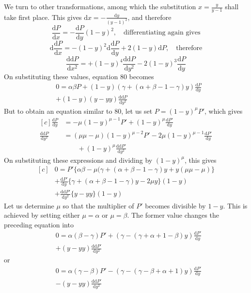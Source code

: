 We turn to other transformations, among which the substitution $x=\frac{y}{y-1}$ shall take first place. This gives $\mathrm{d}x=-\frac{\mathrm{d}y}{(y-1)^2}$, and therefore
\[
\frac{\mathrm{d}P}{\mathrm{d}x}=-\frac{\mathrm{d}P}{\mathrm{d}y}(1-y)^2,
\quad\text{differentiating again gives}
\]
\[
\mathrm{d}\frac{\mathrm{d}P}{\mathrm{d}x}=-(1-y)^2\mathrm{d}\frac{\mathrm{d}P}{\mathrm{d}y}
+2(1-y)\mathrm{d}P,\quad\text{therefore}
\]
\[
\frac{\mathrm{dd}P}{\mathrm{d}x^2}=+(1-y)^4\frac{\mathrm{dd}P}{\mathrm{d}y^2}
-2(1-y)^3\frac{\mathrm{d}P}{\mathrm{d}y}
\]
On substituting these values, equation 80 becomes
\[
\begin{aligned}&0=\alpha\beta P+(1-y)(\gamma+(\alpha+\beta-1-\gamma)y)\frac{\mathrm{d}P}{\mathrm{d}y}\\&+(1-y)(y-yy)\frac{\mathrm{dd}P}{\mathrm{d}y^2}\end{aligned}
\]
But to obtain an equation similar to 80, let us set $P=(1-y)^\mu P'$, which gives
\[
\begin{aligned}[c]
\frac{\mathrm{d}P}{\mathrm{d}y}
&=-\mu(1-y)^{\mu-1}P'+(1-y)^\mu\frac{\mathrm{d}P'}{\mathrm{d}y}\\
\frac{\mathrm{dd}P}{\mathrm{d}y^2}
&=(\mu\mu-\mu)(1-y)^{\mu-2}P'-2\mu(1-y)^{\mu-1}\frac{\mathrm{d}P'}{\mathrm{d}y}
\\&\qquad+(1-y)^\mu\frac{\mathrm{dd}P'}{\mathrm{d}y^2}
\end{aligned}
\]
On substituting these expressions and dividing by $(1-y)^\mu$, this gives
\[
\begin{aligned}[c]
&0=P'\{\alpha\beta-\mu(\gamma+(\alpha+\beta-1-\gamma)y+y(\mu\mu-\mu)\}\\
&+\frac{\mathrm{d}P'}{\mathrm{d}y}\{\gamma+(\alpha+\beta-1-\gamma)y-2\mu y\}(1-y)\\
&+\frac{\mathrm{dd}P'}{\mathrm{d}y^2}\{y-yy\}(1-y)
\end{aligned}
\]
Let us determine $\mu$ so that the multiplier of $P'$ becomes divisible by $1-y$. This is achieved by setting either $\mu=\alpha$ or $\mu=\beta$. The former value changes the preceding equation into
\[
\begin{aligned}&0=\alpha(\beta-\gamma)P'+(\gamma-(\gamma+\alpha+1-\beta)y)\frac{\mathrm{d}P'}{\mathrm{d}y}\\&+(y-yy)\frac{\mathrm{dd}P'}{\mathrm{d}y^2}\end{aligned}
\]
or
\[
\begin{aligned}&0=\alpha(\gamma-\beta)P'-(\gamma-(\gamma-\beta+\alpha+1)y)\frac{\mathrm{d}P'}{\mathrm{d}y}\\&-(y-yy)\frac{\mathrm{dd}P'}{\mathrm{d}y^2}\end{aligned}
\]
